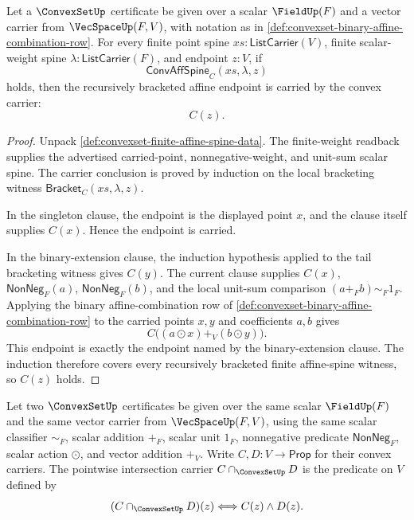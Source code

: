 \begin{theorem}
\label{thm:convexset-finite-affine-spine-closure}
Let a $\ConvexSetUp$ certificate be given over a scalar $\FieldUp(F)$ and a
vector carrier from $\VecSpaceUp(F,V)$, with notation as in
\autoref{def:convexset-binary-affine-combination-row}. For every finite point
spine $xs:\mathsf{ListCarrier}(V)$, finite scalar-weight spine
$\lambda:\mathsf{ListCarrier}(F)$, and endpoint $z:V$, if
$$
\mathsf{ConvAffSpine}_C(xs,\lambda,z)
$$
holds, then the recursively bracketed affine endpoint is carried by the convex
carrier:
$$
C(z).
$$
\end{theorem}
\begin{proof}
Unpack \autoref{def:convexset-finite-affine-spine-data}. The finite-weight
readback supplies the advertised carried-point, nonnegative-weight, and
unit-sum scalar spine. The carrier conclusion is proved by induction on the
local bracketing witness $\mathsf{Bracket}_C(xs,\lambda,z)$.

In the singleton clause, the endpoint is the displayed point $x$, and the
clause itself supplies $C(x)$. Hence the endpoint is carried.

In the binary-extension clause, the induction hypothesis applied to the tail
bracketing witness gives $C(y)$. The current clause supplies $C(x)$,
$\mathsf{NonNeg}_F(a)$, $\mathsf{NonNeg}_F(b)$, and the local unit-sum
comparison $(a+_F b)\sim_F1_F$. Applying the binary affine-combination row of
\autoref{def:convexset-binary-affine-combination-row} to the carried points
$x,y$ and coefficients $a,b$ gives
$$
C\bigl((a\odot x)+_V(b\odot y)\bigr).
$$
This endpoint is exactly the endpoint named by the binary-extension clause.
The induction therefore covers every recursively bracketed finite affine-spine
witness, so $C(z)$ holds.
\end{proof}

\begin{definition}
\label{def:convexset-pointwise-intersection-carrier}
Let two $\ConvexSetUp$ certificates be given over the same scalar $\FieldUp(F)$ and the same vector carrier from $\VecSpaceUp(F,V)$, using the same scalar classifier $\sim_F$, scalar addition $+_F$, scalar unit $1_F$, nonnegative predicate $\mathsf{NonNeg}_F$, scalar action $\odot$, and vector addition $+_V$. Write $C,D:V\to\mathsf{Prop}$ for their convex carriers. The pointwise intersection carrier $C\cap_{\ConvexSetUp}D$ is the predicate on $V$ defined by
$$
(C\cap_{\ConvexSetUp}D)(z)\Longleftrightarrow C(z)\land D(z).
$$
\end{definition}

